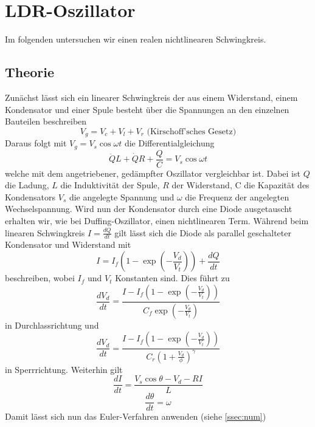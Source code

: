 \documentclass{scrartcl}
\begin{document}
\section {LDR-Oszillator}
Im folgenden untersuchen wir einen realen nichtlinearen Schwingkreis.
\subsection { Theorie } \label{ssec:theo}
Zunächst lässt sich ein linearer Schwingkreis der aus einem Widerstand, einem Kondensator und einer Spule besteht über die Spannungen an den einzelnen Bauteilen beschreiben
$$V_g=V_c+V_l+V_r \text{ (Kirschoff'sches Gesetz)}$$
Daraus folgt mit $V_g=V_s\cos{\omega t}$ die Differentialgleichung
$$\ddot{Q}L + \dot{Q}R+ \frac{Q}{C} = V_s\cos{\omega t}$$
welche mit dem angetriebener, gedämpfter Oszillator vergleichbar ist. Dabei ist $Q$ die Ladung, $L$ die Induktivität der Spule, $R$ der Widerstand, C die Kapazität des Kondensators $V_s$ die angelegte Spannung und $\omega$ die Frequenz der angelegten Wechselspannung.
\newline
Wird nun der Kondensator durch eine Diode ausgetauscht erhalten wir, wie bei Duffing-Oszillator, einen nichtlinearen Term. Während beim linearen Schwingkreis $I=\frac{dQ}{dt}$ gilt lässt sich die Diode als parallel geschalteter Kondensator und Widerstand mit 
$$I=I_f(1-\exp(-\frac{V_d}{V_t})) + \frac{dQ}{dt}$$
beschreiben, wobei $I_f$ und $V_t$ Konstanten sind.
Dies führt zu
$$\frac{dV_d}{dt}= \frac{I-I_f(1-\exp(-\frac{V_d}{V_t}))}{C_f\exp(-\frac{V_d}{V_t})} $$
in Durchlassrichtung und 
$$\frac{dV_d}{dt}= \frac{I-I_f(1-\exp(-\frac{V_d}{V_t}))}{C_r(1+\frac{V_d}{\phi})^{\gamma}}$$
in Sperrrichtung.
Weiterhin gilt
$$\frac{dI}{dt}=\frac{V_s \cos{\theta} - V_d - RI}{L}$$
$$\frac{d\theta}{dt}=\omega$$
Damit lässt sich nun das Euler-Verfahren anwenden (siehe \ref{ssec:num})
\end{document}
